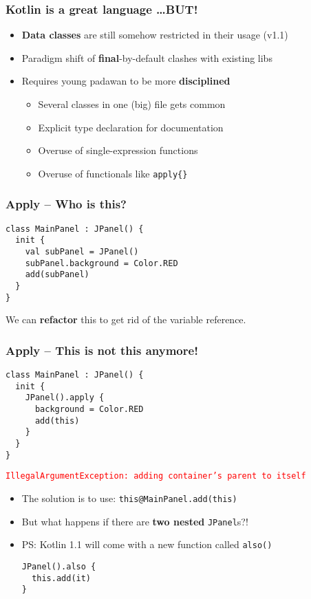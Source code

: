 \begin{frame}
\frametitle{Kotlin is a great language \pause \ldots BUT! \pause}
\begin{itemize}
	\item \textbf{Data classes} are still somehow restricted in their usage (v1.1)
	\item Paradigm shift of \textbf{final}-by-default clashes with existing libs
	\item Requires young padawan to be more \textbf{disciplined}
	\begin{itemize}
		\item Several classes in one (big) file gets common
		\item Explicit type declaration for documentation
		\item Overuse of single-expression functions
		\item Overuse of functionals like \texttt{apply\{\}}
	\end{itemize}
\end{itemize}
\end{frame}


\begin{frame}[fragile] \frametitle{Apply -- Who is this?}
\begin{lstlisting}
class MainPanel : JPanel() {
  init {
    val subPanel = JPanel()
    subPanel.background = Color.RED
    add(subPanel)
  }
}
\end{lstlisting}
\pause
We can \textbf{refactor} this to get rid of the variable reference.
\vspace{3.3cm}
\end{frame}


\begin{frame}[fragile] \frametitle{Apply -- This is not this anymore!}
\begin{lstlisting}
class MainPanel : JPanel() {
  init {
    JPanel().apply {
      background = Color.RED
      add(this)
    }
  }
}
\end{lstlisting}
\pause
\footnotesize{\texttt{\textcolor{red}{IllegalArgumentException: adding container's parent to itself}}}
\pause
\begin{itemize}[<+->]
	\item The solution is to use: \texttt{this\textcolor{someBlue}{@MainPanel}.add(this)}
	\item But what happens if there are \textbf{two nested} \texttt{JPanel}s?!
	\item PS: Kotlin 1.1 will come with a new function called \texttt{also()}
\begin{lstlisting}
JPanel().also {
  this.add(it)
}
\end{lstlisting}

\end{itemize}
\end{frame}



